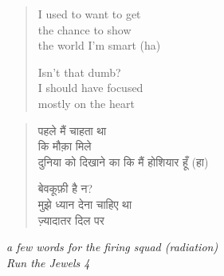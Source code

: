 \clearpage\thispagestyle{empty}\vspace*{\fill}

\begin{verse}
I used to want to get \\
the chance to show \\
the world I'm smart (ha)

Isn't that dumb? \\
I should have focused \\
mostly on the heart
\end{verse}
\begin{verse}\small
पहले मैं चाहता था \\
कि मौक़ा मिले \\
दुनिया को दिखाने का कि मैं होशियार हूँ (हा)

बेवकूफ़ी है न? \\
मुझे ध्यान देना चाहिए था \\
ज़्यादातर दिल पर
\end{verse}
\begin{flushright}\small\itshape
a few words for the firing squad (radiation) \\
Run the Jewels 4
\end{flushright}

\vspace*{\fill}\clearpage
